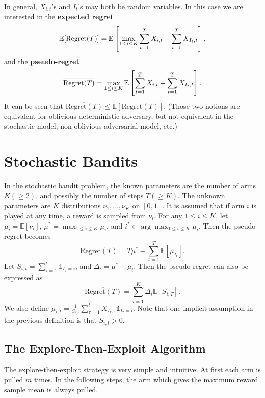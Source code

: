\documentclass[openany]{book}
\theoremstyle{definition}
\theoremstyle{remark}
\begin{document}
In general, $X_{i,t}$'s and $I_t$'s may both be random variables. In this case we are interested in the \textbf{expected regret}
\begin{equation}\label{expectedRegret}
    \mathbb{E}[\mathrm{Regret}(T)]=\mathbb{E}\sbr{\max_{1\le i\le K}\sum_{t=1}^{T}X_{i,t}-\sum_{t=1}^{T}X_{I_t,t}},
\end{equation}
and the \textbf{pseudo-regret}
\begin{equation}\label{pseudoRegret}
    \overline{\mathrm{Regret}(T)}=\max_{1\le i\le K}\mathbb{E}\sbr{\sum_{t=1}^{T}X_{i,t}-\sum_{t=1}^{T}X_{I_t,t}}.
\end{equation}
It can be seen that $\overline{\mathrm{Regret}(T)}\le \mathbb{E}[\mathrm{Regret}(T)]$. (Those two notions are equivalent for oblivious deterministic adversary, but not equivalent in the stochastic model, non-oblivious adversarial model, etc.)

\chapter{Stochastic Bandits}
In the stochastic bandit problem, the known parameters are the number of arms $K(\ge2)$, and possibly the number of steps $T(\ge K)$. The unknown parameters are $K$ distributions $\nu_1,\ldots,\nu_K$ on $[0,1]$. It is assumed that if arm $i$ is played at any time, a reward is sampled from $\nu_i$. For any $1\le i\le K$, let $\mu_i=\mathbb{E}[\nu_i]$, $\mu^*=\max_{1\le i\le K}\mu_i$, and $i^*\in\arg\max_{1\le i\le K}\mu_i$. Then the pseudo-regret becomes
\begin{equation}\label{stochPseudoRegret}
    \overline{\mathrm{Regret}(T)}=T\mu^*-\sum_{t=1}^{T}\mathbb{E}[\mu_{I_t}].
\end{equation}
Let $S_{i,t}=\sum_{\tau=1}^{t}\mathds{1}_{I_{\tau}=i}$, and $\Delta_i=\mu^*-\mu_i$. Then the pseudo-regret can also be expressed as
\begin{equation}\label{stochPseudoRegretAlt}
    \overline{\mathrm{Regret}(T)}=\sum_{i=1}^{K}\Delta_i \mathbb{E}[S_{i,T}].
\end{equation}
We also define $\mu_{i,t}=\frac{1}{S_{i,t}}\sum_{\tau=1}^{t}X_{I_{\tau},\tau}\mathds{1}_{I_{\tau}=i}$. Note that one implicit assumption in the previous definition is that $S_{i,t}>0$.

\section{The Explore-Then-Exploit Algorithm}
The explore-then-exploit strategy is very simple and intuitive: At first each arm is pulled $m$ times. In the following steps, the arm which gives the maximum reward sample mean is always pulled.
\end{document}
